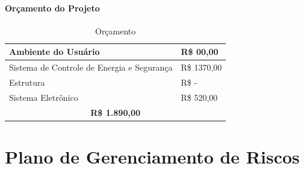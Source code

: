 \begin{apendicesenv}
\subsubsection{Orçamento do Projeto}
\begin{table}[htp]
    \centering
    \caption{Orçamento}
    \label{orcamento}
    \begin{tabular}{|l|l|}
    \hline
    Ambiente do Usuário & R\$ 00,00 \\ \hline
    Sistema de Controle de Energia e Segurança & R\$ 1370,00 \\ \hline
    Estrutura & R\$ - \\ \hline
    Sistema Eletrônico & R\$ 520,00 \\ \hline
    \multicolumn{2}{|c|}{\textbf{R\$ 1.890,00}} \\ \hline
    \end{tabular}
\end{table}
    

\chapter{Plano de Gerenciamento de Riscos}

\end{apendicesenv}
